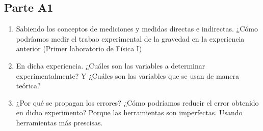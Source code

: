 \subsection{Parte A1}%
\label{sub:cues_parte_a1}

\begin{enumerate}
	\item Sabiendo los conceptos de mediciones y medidas directas e indirectas.
		¿Cómo podríamos medir el trabao experimental de la gravedad en la experiencia anterior
		(Primer laboratorio de Física I)
		\subitem %
	\item En dicha experiencia. ¿Cuáles son las variables a determinar experimentalmente?
		Y ¿Cuáles son las variables que se usan de manera teórica?
		\subitem %
	\item ¿Por qué se propagan los errores?
		¿Cómo podríamos reducir el error obtenido en dicho experimento?
		\subitem Porque las herramientas son imperfectas.
			Usando herramientas más prescisas.
\end{enumerate}
